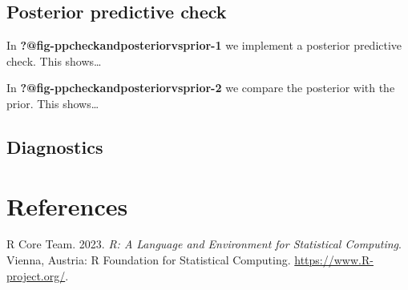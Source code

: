 \documentclass[
  letterpaper,
  DIV=11,
  numbers=noendperiod]{scrartcl}
\newlength{\cslhangindent}
\newenvironment{CSLReferences}[2] %
 {\begin{list}{}{%
  \setlength{\itemindent}{0pt}
  \setlength{\leftmargin}{0pt}
  \setlength{\parsep}{0pt}
  \ifodd #1
   \setlength{\leftmargin}{\cslhangindent}
   \setlength{\itemindent}{-1\cslhangindent}
  \fi
  \setlength{\itemsep}{#2\baselineskip}}}
 {\end{list}}
\begin{document}
\subsection{Posterior predictive
check}\label{posterior-predictive-check}

In \textbf{?@fig-ppcheckandposteriorvsprior-1} we implement a posterior
predictive check. This shows\ldots{}

In \textbf{?@fig-ppcheckandposteriorvsprior-2} we compare the posterior
with the prior. This shows\ldots{}

\subsection{Diagnostics}\label{diagnostics}

\newpage

\section*{References}\label{references}

\label{refs}
\begin{CSLReferences}{1}{0}
R Core Team. 2023. \emph{{R: A Language and Environment for Statistical
Computing}}. Vienna, Austria: R Foundation for Statistical Computing.
\url{https://www.R-project.org/}.

\end{CSLReferences}
\end{document}
